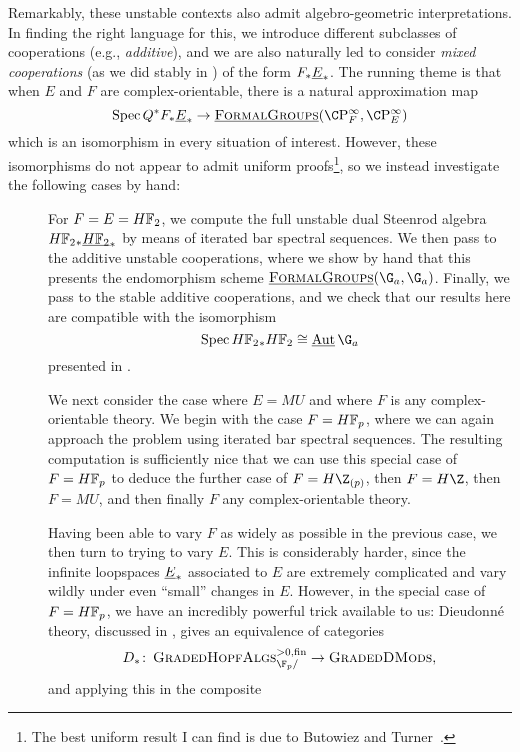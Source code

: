 Remarkably, these unstable contexts also admit algebro-geometric interpretations.  In finding the right language for this, we introduce different subclasses of cooperations (e.g., \textit{additive}), and we are also naturally led to consider \textit{mixed cooperations} (as we did stably in ) of the form \(F_* \underline{\smash{E}}_{*}\).  The running theme is that when \(E\) and \(F\) are complex-orientable, there is a natural approximation map \[\Spec Q^* F_* \OS{E}{*} \to \InternalHom{FormalGroups}(\CP^\infty_F, \CP^\infty_E)\] which is an isomorphism in every situation of interest.  However, these isomorphisms do not appear to admit uniform proofs\footnote{The best uniform result I can find is due to Butowiez and Turner~\cite[Theorem 3.12]{ButowiezTurner}.}, so we instead investigate the following cases by hand:
\begin{description}
\item[{}] For \(F = E = \HFtwo\), we compute the full unstable dual Steenrod algebra \(\HFtwo_* \OS{\HFtwo}{*}\) by means of iterated bar spectral sequences.  We then pass to the additive unstable cooperations, where we show by hand that this presents the endomorphism scheme \(\InternalHom{FormalGroups}(\G_a, \G_a)\).  Finally, we pass to the stable additive cooperations, and we check that our results here are compatible with the isomorphism \[\Spec \HFtwo_* \HFtwo \cong \InternalAut{\G_a}\] presented in .
\item[{}] We next consider the case where \(E = MU\) and where \(F\) is any complex-orientable theory.  We begin with the case \(F = \HFp\), where we can again approach the problem using iterated bar spectral sequences.  The resulting computation is sufficiently nice that we can use this special case of \(F = \HFp\) to deduce the further case of \(F = H\Z_{(p)}\), then \(F = H\Z\), then \(F = MU\), and then finally \(F\) any complex-orientable theory.
\item[{}] Having been able to vary \(F\) as widely as possible in the previous case, we then turn to trying to vary \(E\).  This is considerably harder, since the infinite loopspaces \(\underline{\smash{E}}_{*}\) associated to \(E\) are extremely complicated and vary wildly under even ``small'' changes in \(E\).  However, in the special case of \(F = \HFp\), we have an incredibly powerful trick available to us: Dieudonn\'e theory, discussed in , gives an equivalence of categories \[D_*\co \CatOf{GradedHopfAlgs}^{> 0, \fin}_{\F_p/} \to \CatOf{GradedDMods},\] and applying this in the composite

\end{description}
